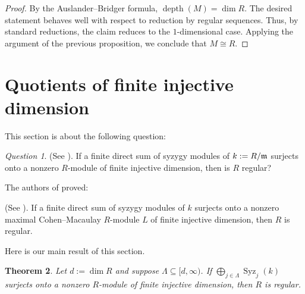 \documentclass[10. pt,a4paper]{amsart}
\newtheorem{theorem}{Theorem}[section]
\theoremstyle{definition}
\theoremstyle{remark}
\newtheorem{question}[theorem]{Question}
\newcommand{\depth}{\operatorname{depth}}
\newcommand{\fm}{\frak{m}}
\begin{document}
\begin{proof}
	By the Auslander--Bridger formula, $\depth(M) = \dim R$. The desired statement behaves well with respect to reduction by regular sequences. Thus, by standard reductions, the claim reduces to the $1$-dimensional case. Applying the argument of the previous proposition, we conclude that $M \cong R$.
\end{proof}


\section{Quotients of finite injective dimension}

This section is about the following question:

\begin{question}
	(See \cite[Question 1.7]{q3}). If a finite direct sum of syzygy modules of $k := R/\fm$ surjects onto a nonzero $R$-module of finite injective dimension, then is $R$ regular?
\end{question}

The authors of \cite{q3} proved:

\begin{fact}\label{ii}
	(See \cite[Corollary 3.4]{q3}). If a finite direct sum of syzygy modules of $k$ surjects onto a nonzero maximal Cohen--Macaulay $R$-module $L$ of finite injective dimension, then $R$ is regular.
\end{fact}

Here is our main result of this section.

\begin{theorem}
	Let $d := \dim R$ and suppose $\Lambda \subseteq [d, \infty)$. If $\bigoplus_{j \in \Lambda} \operatorname{Syz}_j(k)$ surjects onto a nonzero $R$-module of finite injective dimension, then $R$ is regular.
\end{theorem}
\end{document}

